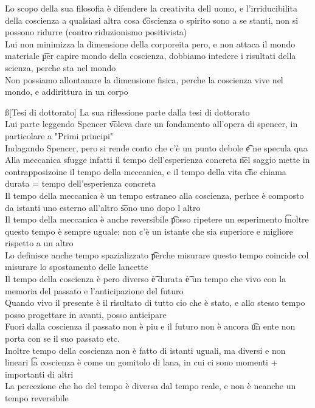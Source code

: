 \documentclass[12pt]{article}
\begin{document}
\v

Lo scopo della sua filosofia è difendere la creativita dell uomo, e l'irriducibilita della coscienza a qualsiasi altra cosa \t coscienza o spirito sono a se stanti, non si possono ridurre (contro riduzionismo positivista) \\
Lui non minimizza la dimensione della corporeita pero, e non attaca il mondo materiale \t per capire mondo della coscienza, dobbiamo intedere i risultati della scienza, perche sta nel mondo \\
Non possiamo allontanare la dimensione fisica, perche la coscienza vive nel mondo, e addirittura in un corpo

\ss[Tesi di dottorato]
La sua riflessione parte dalla tesi di dottorato \\
Lui parte leggendo Spencer \t voleva dare un fondamento all'opera di spencer, in particolare a "Primi principi" \\
Indagando Spencer, pero si rende conto che c'è un punto debole \t e ne specula qua \\
Alla meccanica sfugge infatti il tempo dell'esperienza concreta \t nel saggio mette in contrapposizoine il tempo della meccanica, e il tempo della vita \t che chiama durata = tempo dell'esperienza concreta \\
Il tempo della meccanica è un tempo estraneo alla coscienza, perhce è composto da istanti uno esterno all'altro \t sono uno dopo l altro \\
Il tempo della meccanica è anche reversibile \t posso ripetere un esperimento \t inoltre questo tempo è sempre uguale: non c'è un istante che sia superiore e migliore rispetto a un altro \\
Lo definisce anche tempo spazializzato \t perche misurare questo tempo coincide col misurare lo spostamento delle lancette \\
Il tempo della coscienza è pero diverso \t è durata \t è un tempo che vivo con la memoria del passato e l'anticipazione del futuro \\
Quando vivo il presente è il risultato di tutto cio che è stato, e allo stesso tempo posso progettare in avanti, posso anticipare \\
Fuori dalla coscienza il passato non è piu e il futuro non è ancora \t un ente non porta con se il suo passato etc. \\
Inoltre tempo della coscienza non è fatto di istanti uguali, ma diversi e non lineari \t la coscienza è come un gomitolo di lana, in cui ci sono momenti + importanti di altri \\
La percezione che ho del tempo è diversa dal tempo reale, e non è neanche un tempo reversibile
\end{document}

